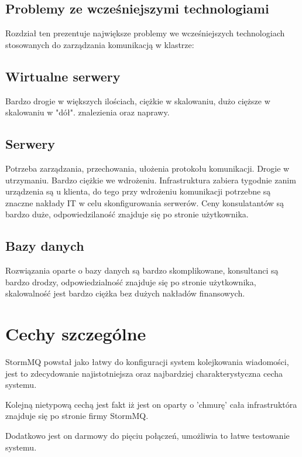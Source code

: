\documentclass[paper=a4, fontsize=11pt]{scrartcl} %
\numberwithin{equation}{section} %
\numberwithin{figure}{section} %
\numberwithin{table}{section} %
\begin{document}
\subsection{Problemy ze wcześniejszymi technologiami}

Rozdział ten prezentuje największe problemy we wcześniejszych technologiach stosowanych do
zarządzania komunikacją w klastrze:

\subsection{Wirtualne serwery}

Bardzo drogie w większych ilościach, ciężkie w skalowaniu, dużo cięższe w skalowaniu w "dół".
znalezienia oraz naprawy.


\subsection{Serwery}

Potrzeba zarządzania, przechowania, ułożenia protokołu komunikacji. Drogie w utrzymaniu.
Bardzo ciężkie we wdrożeniu. Infrastruktura zabiera tygodnie zanim urządzenia są u klienta,
do tego przy wdrożeniu komunikacji potrzebne są znaczne nakłady IT w celu skonfigurowania serwerów.
Ceny konsulatantów są bardzo duże, odpowiedzilaność znajduje się po stronie użytkownika.

\subsection{Bazy danych}

Rozwiązania oparte o bazy danych są bardzo skomplikowane, konsultanci są bardzo drodzy,
odpowiedzialność znajduje się po stronie użytkownika, skalowalność jest bardzo ciężka bez
dużych nakładów finansowych.

\section{Cechy szczególne}

StormMQ powstał jako łatwy do konfiguracji system kolejkowania wiadomości, jest to zdecydowanie
najistotniejsza oraz najbardziej charakterystyczna cecha systemu.

Kolejną nietypową cechą jest fakt iż jest on oparty o 'chmurę' cała infrastruktóra znajduje się
po stronie firmy StormMQ.

Dodatkowo jest on darmowy do pięciu połączeń, umożliwia to łatwe testowanie systemu.
\end{document}
